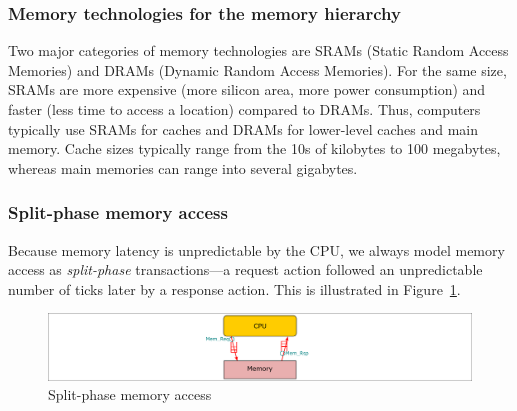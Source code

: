 
\subsubsection{Memory technologies for the memory hierarchy}



Two major categories of memory technologies are SRAMs (Static Random
Access Memories) and DRAMs (Dynamic Random Access Memories).  For the
same size, SRAMs are more expensive (more silicon area, more power
consumption) and faster (less time to access a location) compared to
DRAMs.  Thus, computers typically use SRAMs for caches and DRAMs for
lower-level caches and main memory.  Cache sizes typically range from
the 10s of kilobytes to 100 megabytes, whereas main memories can range
into several gigabytes.


\subsubsection{Split-phase memory access}



Because memory latency is unpredictable by the CPU, we always model
memory access as \emph{split-phase} transactions---a request action
followed an unpredictable number of ticks later by a response action.
This is illustrated in Figure~\ref{Fig_BSV_Split_Phase_Mem}.
\begin{figure}[htbp]
  \centerline{\includegraphics[width=6in,angle=0]{Figures/Fig_BSV_Split_Phase_Mem}}
  \caption{\label{Fig_BSV_Split_Phase_Mem} Split-phase memory access}
\end{figure}


